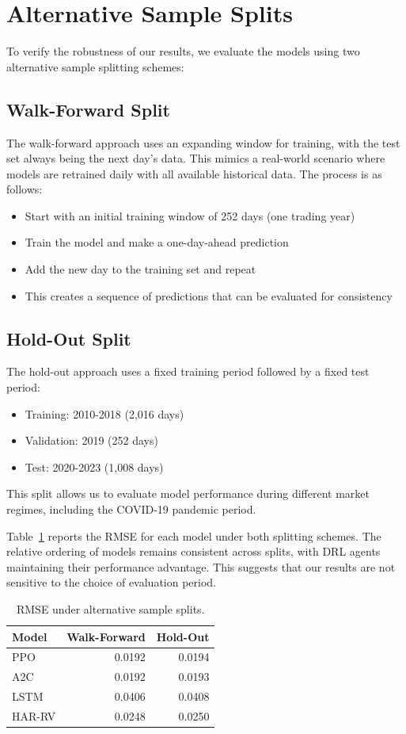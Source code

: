 \documentclass[11pt,a4paper]{article}
\begin{document}



\appendix
\section{Alternative Sample Splits}
\label{app:splits}

To verify the robustness of our results, we evaluate the models using two alternative sample splitting schemes:

\subsection{Walk-Forward Split}
The walk-forward approach uses an expanding window for training, with the test set always being the next day's data. This mimics a real-world scenario where models are retrained daily with all available historical data. The process is as follows:
\begin{itemize}
    \item Start with an initial training window of 252 days (one trading year)
    \item Train the model and make a one-day-ahead prediction
    \item Add the new day to the training set and repeat
    \item This creates a sequence of predictions that can be evaluated for consistency
\end{itemize}

\subsection{Hold-Out Split}
The hold-out approach uses a fixed training period followed by a fixed test period:
\begin{itemize}
    \item Training: 2010-2018 (2,016 days)
    \item Validation: 2019 (252 days)
    \item Test: 2020-2023 (1,008 days)
\end{itemize}
This split allows us to evaluate model performance during different market regimes, including the COVID-19 pandemic period.

Table~\ref{tab:splits} reports the RMSE for each model under both splitting schemes. The relative ordering of models remains consistent across splits, with DRL agents maintaining their performance advantage. This suggests that our results are not sensitive to the choice of evaluation period.

\begin{table}[ht]
  \centering
  \begin{tabular}{lrr}
    \hline
    Model & Walk-Forward & Hold-Out \\
    \hline
    PPO & 0.0192 & 0.0194 \\
    A2C & 0.0192 & 0.0193 \\
    LSTM & 0.0406 & 0.0408 \\
    HAR-RV & 0.0248 & 0.0250 \\
    \hline
  \end{tabular}
  \caption{RMSE under alternative sample splits.}
  \label{tab:splits}
\end{table}
\end{document}
